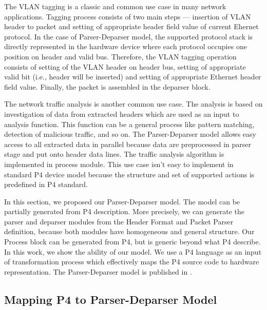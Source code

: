 The VLAN tagging is a classic and common use case in many network applications. 
Tagging process consists of two main steps --- insertion of VLAN header to packet and setting of appropriate header field value of 
current Ehernet protocol.
In the case of Parser-Deparser model, the supported protocol stack is directly represented in the hardware device where each protocol
occupies one position on header and valid bus. 
Therefore, the VLAN tagging operation consists of setting of the VLAN header on header bus, setting of appropriate valid bit 
(i.e., header will be inserted) and setting of appropriate Ethernet header field value. Finally, the packet is assembled in the deparser block. 
 
The network traffic analysis is another common use case.
The analysis is based on investigation of data from extracted headers which are used 
as an input to analysis function. This function can be a general process like pattern matching, detection of malicious traffic, and so on. 
The Parser-Deparser model allows easy access to all extracted data in parallel because data are preprocessed in parser stage and put onto header
data lines. The traffic analysis algorithm is implemented in process module. This use case isn't easy to implement in standard P4 device model
because the structure and set of supported actions is predefined in P4 standard.

In this section, we proposed our Parser-Deparser model. The model can be partially generated from P4 description.
More precisely, we can generate the parser and deparser modules from the Header Format and Packet Parser definition, because both 
modules have homogeneous and general structure. Our Process block can be generated from P4, but is generic beyond what P4 describe.
In this work, we show the ability of our model. 
We use a P4 language as an input of transformation process which effectively maps the P4 source code to hardware representation.
The Parser-Deparser model is published in \cite{2016MicproP4}.

\subsection{Mapping P4 to Parser-Deparser Model}
\label{sec:architectureOfProcessingPipeline}

